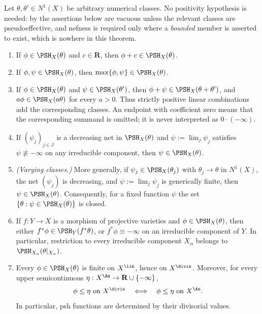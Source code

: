 \begin{theorem}
\label{thm:bj-basic-closure}
Let \(\theta,\theta'\in N^1(X)\) be arbitrary numerical classes.  No
positivity hypothesis is needed: by  the
assertions below are vacuous unless the relevant classes are
pseudoeffective, and nefness is required only where a \emph{bounded} member
is asserted to exist, which is nowhere in this theorem.
\begin{enumerate}
\item If \(\phi\in\PSH_X(\theta)\) and \(c\in\mathbf R\), then
      \(\phi+c\in\PSH_X(\theta)\).
\item If \(\phi,\psi\in\PSH_X(\theta)\), then
      \(\max\{\phi,\psi\}\in\PSH_X(\theta)\).
\item If \(\phi\in\PSH_X(\theta)\) and
      \(\psi\in\PSH_X(\theta')\), then
      \(\phi+\psi\in\PSH_X(\theta+\theta')\), and
      \(a\phi\in\PSH_X(a\theta)\) for every \(a>0\).  Thus strictly
      positive linear combinations add the corresponding classes.  An
      endpoint with coefficient zero means that the corresponding summand
      is omitted; it is never interpreted as \(0\cdot(-\infty)\).
\item If \((\psi_j)_{j\in J}\) is a decreasing net in \(\PSH_X(\theta)\) and
      \(\psi:=\lim_j\psi_j\) satisfies \(\psi\not\equiv-\infty\) on any
      irreducible component, then \(\psi\in\PSH_X(\theta)\).
\item \emph{(Varying classes.)}  More generally, if \(\psi_j\in\PSH_X(\theta_j)\)
      with \(\theta_j\to\theta\) in \(N^1(X)\), the net \((\psi_j)\) is
      decreasing, and \(\psi:=\lim_j\psi_j\) is generically finite, then
      \(\psi\in\PSH_X(\theta)\).  Consequently, for a fixed function
      \(\psi\) the set \(\{\theta:\psi\in\PSH_X(\theta)\}\) is closed.
\item If \(f:Y\to X\) is a morphism of projective varieties and
      \(\phi\in\PSH_X(\theta)\), then either
      \(f^*\phi\in\PSH_Y(f^*\theta)\), or \(f^*\phi\equiv-\infty\) on an
      irreducible component of \(Y\).  In particular, restriction to every
      irreducible component \(X_\alpha\) belongs to
      \(\PSH_{X_\alpha}(\theta|_{X_\alpha})\).
\item\label{itm:bj-closure:determination} Every \(\phi\in\PSH_X(\theta)\) is finite on
      \(X^{\lin}\), hence on \(X^{\divis}\).  Moreover, for every upper
      semicontinuous \(\eta:X^{\An}\to\mathbf R\cup\{-\infty\}\),
      \[
       \phi\leq\eta\ \text{on }X^{\divis}
       \quad\Longleftrightarrow\quad
       \phi\leq\eta\ \text{on }X^{\An}.
      \]
      In particular, psh functions are determined by their divisorial
      values.
\end{enumerate}
\end{theorem}

